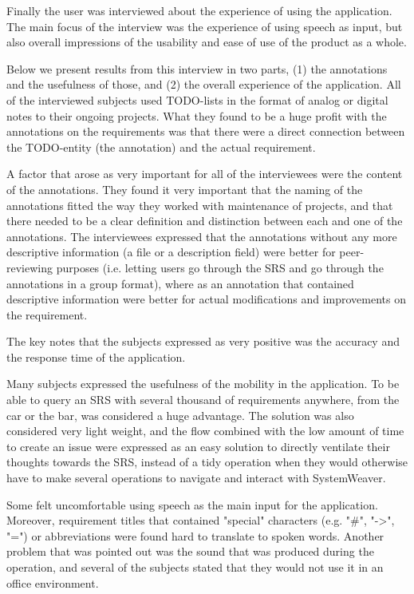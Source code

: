 \documentclass[conference]{IEEEtran}
\begin{document}
Finally the user was interviewed about the experience of using the application. The main focus of the interview was the experience of using speech as input, but also overall impressions of the usability and ease of use of the product as a whole. 

Below we present results from this interview in two parts, (1) the annotations and the usefulness of those, and (2) the overall experience of the application.
All of the interviewed subjects used TODO-lists in the format of analog or digital notes to their ongoing projects. What they found to be a huge profit with the annotations on the requirements was that there were a direct connection between the TODO-entity (the annotation) and the actual requirement. 

A factor that arose as very important for all of the interviewees were the content of the annotations. They found it very important that the naming of the annotations fitted the way they worked with maintenance of projects, and that there needed to be a clear definition and distinction between each and one of the annotations. The interviewees expressed that the annotations without any more descriptive information (a file or a description field) were better for peer-reviewing purposes (i.e. letting users go through the SRS and go through the annotations in a group format), where as an annotation that contained descriptive information were better for actual modifications and improvements on the requirement. 

The key notes that the subjects expressed as very positive was the accuracy and the response time of the application. 

Many subjects expressed the usefulness of the mobility in the application. To be able to query an SRS with several thousand of requirements anywhere, from the car or the bar, was considered a huge advantage. The solution was also considered very light weight, and the flow combined with the low amount of time to create an issue were expressed as an easy solution to directly ventilate their thoughts towards the SRS, instead of a tidy operation when they would otherwise have to make several operations to navigate and interact with SystemWeaver.

Some felt uncomfortable using speech as the main input for the application. Moreover, requirement titles that contained "special" characters (e.g. "\#", "-\textgreater", "=") or abbreviations were found hard to translate to spoken words. Another problem that was pointed out was the sound that was produced during the operation, and several of the subjects stated that they would not use it in an office environment.
\end{document}

